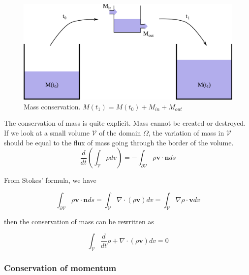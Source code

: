 \begin{figure}[!h]
\centering
\includegraphics[scale=0.8]{images/continuum_mechanics/massConservation.png}
\caption[STAR mechanics: Mass conservation]{\label{fig:massConservation} Mass conservation. $M(t_{1}) = M(t_{0}) + M_{in} + M_{out}$}
\end{figure}

The conservation of mass is quite explicit. Mass cannot be created or destroyed. If we look at a small volume $\mathcal{V}$ of the domain $\Omega$, the variation of mass in $\mathcal{V}$ should be equal to the flux of mass going through the border of the volume.
\begin{equation}
    \label{eq:massConservation}
    \displaystyle 
    \frac{d}{dt}\left( \int_{\mathcal{V}} \rho dv \right)
    =
    - \int_{\mathcal{\partial V}}\rho \mathbf{v} \cdot \mathbf{n} ds
\end{equation}

From Stokes' formula, we have

\begin{equation}
\displaystyle 
\int_{\partial \mathcal{V}} \rho \mathbf{v} \cdot \mathbf{n} ds =
\int_{\mathcal{V}} \nabla \cdot \left( \rho \mathbf{v} \right) dv =
\int_{\mathcal{V}} \nabla \rho \cdot \mathbf{v} dv
\end{equation}

then the conservation of mass can be rewritten as

\begin{equation}
\label{eq:volumetricMassConservation}
\displaystyle \int_{\mathcal{V}} \frac{d}{dt} \rho + \nabla \cdot \left( \rho  \mathbf{v} \right) dv = 0
\end{equation}

\subsubsection{Conservation of momentum}

